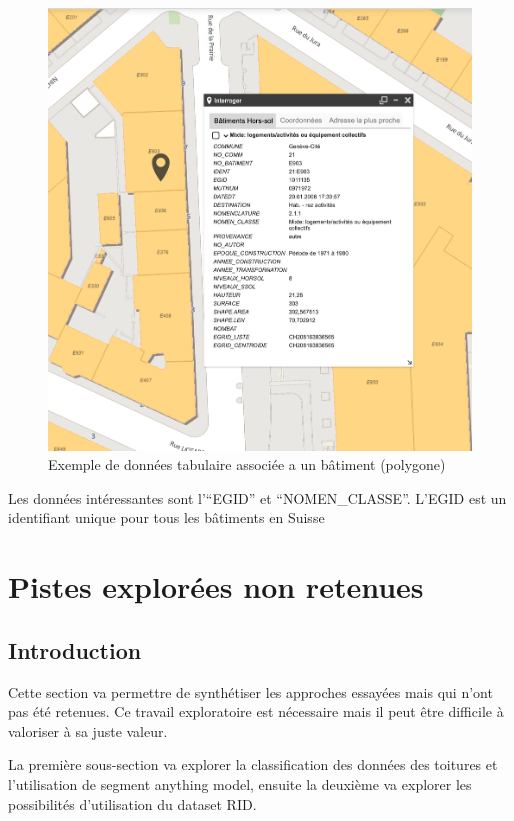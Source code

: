 \begin{figure}[H]
    \centering
    \includegraphics[width=1\linewidth]{02-main//figures/dataset_methodo_02_batiment_horsol_donnees.png}
    \caption{Exemple de données tabulaire associée a un bâtiment (polygone)}
    \label{fig:dataset_methodo_02_batiment_horsol_donnees}
\end{figure}
Les données intéressantes sont l'``EGID'' et ``NOMEN\_CLASSE''. L'EGID est un identifiant unique pour tous les bâtiments en Suisse


\section{Pistes explorées non retenues}
\subsection{Introduction}
Cette section va permettre de synthétiser les approches essayées mais qui n'ont pas été retenues. Ce travail exploratoire est nécessaire mais il peut être difficile à valoriser à sa juste valeur.

La première sous-section va explorer la classification des données des toitures et l'utilisation de segment anything model, ensuite la deuxième va explorer les possibilités d'utilisation du dataset RID.

